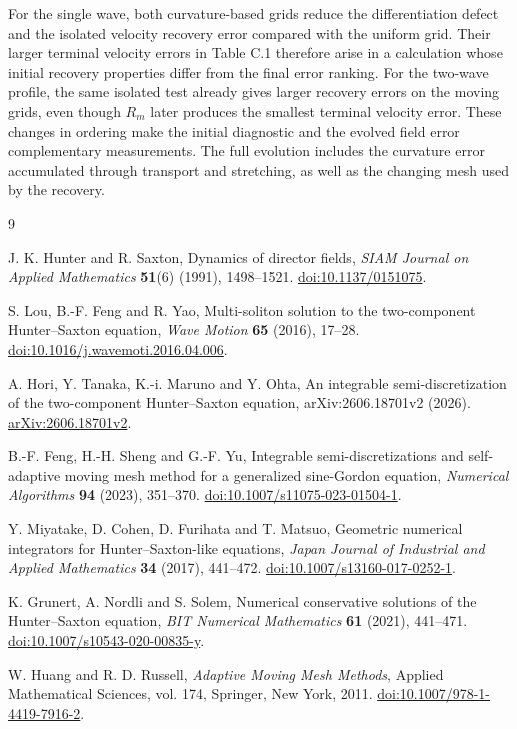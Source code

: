 \documentclass[11pt,a4paper]{article}
\begin{document}
For the single wave, both curvature-based grids reduce the differentiation defect and the isolated velocity recovery error compared with the uniform grid. Their larger terminal velocity errors in Table C.1 therefore arise in a calculation whose initial recovery properties differ from the final error ranking. For the two-wave profile, the same isolated test already gives larger recovery errors on the moving grids, even though \(R_m\) later produces the smallest terminal velocity error. These changes in ordering make the initial diagnostic and the evolved field error complementary measurements. The full evolution includes the curvature error accumulated through transport and stretching, as well as the changing mesh used by the recovery.


\FloatBarrier
\renewcommand{\refname}{References}
\begin{thebibliography}{9}

J. K. Hunter and R. Saxton,
Dynamics of director fields,
\textit{SIAM Journal on Applied Mathematics} \textbf{51}(6) (1991), 1498--1521.
\href{https://doi.org/10.1137/0151075}{doi:10.1137/0151075}.

S. Lou, B.-F. Feng and R. Yao,
Multi-soliton solution to the two-component Hunter--Saxton equation,
\textit{Wave Motion} \textbf{65} (2016), 17--28.
\href{https://doi.org/10.1016/j.wavemoti.2016.04.006}{doi:10.1016/j.wavemoti.2016.04.006}.

A. Hori, Y. Tanaka, K.-i. Maruno and Y. Ohta,
An integrable semi-discretization of the two-component Hunter--Saxton equation,
arXiv:2606.18701v2 (2026).
\href{https://arxiv.org/abs/2606.18701v2}{arXiv:2606.18701v2}.

B.-F. Feng, H.-H. Sheng and G.-F. Yu,
Integrable semi-discretizations and self-adaptive moving mesh method for a generalized sine-Gordon equation,
\textit{Numerical Algorithms} \textbf{94} (2023), 351--370.
\href{https://doi.org/10.1007/s11075-023-01504-1}{doi:10.1007/s11075-023-01504-1}.

Y. Miyatake, D. Cohen, D. Furihata and T. Matsuo,
Geometric numerical integrators for Hunter--Saxton-like equations,
\textit{Japan Journal of Industrial and Applied Mathematics} \textbf{34} (2017), 441--472.
\href{https://doi.org/10.1007/s13160-017-0252-1}{doi:10.1007/s13160-017-0252-1}.

K. Grunert, A. Nordli and S. Solem,
Numerical conservative solutions of the Hunter--Saxton equation,
\textit{BIT Numerical Mathematics} \textbf{61} (2021), 441--471.
\href{https://doi.org/10.1007/s10543-020-00835-y}{doi:10.1007/s10543-020-00835-y}.

W. Huang and R. D. Russell,
\textit{Adaptive Moving Mesh Methods},
Applied Mathematical Sciences, vol. 174, Springer, New York, 2011.
\href{https://doi.org/10.1007/978-1-4419-7916-2}{doi:10.1007/978-1-4419-7916-2}.

\end{thebibliography}
\end{document}
